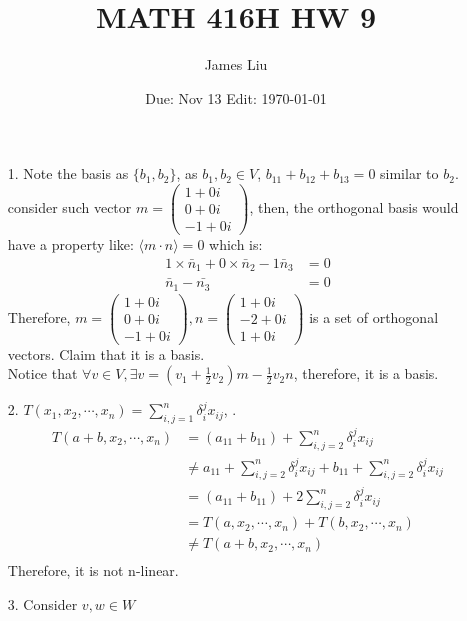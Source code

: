 \documentclass{article}
\date{Due: Nov 13 Edit: \today}
\title{MATH 416H HW 9}
\author{James Liu}
\begin{document}
\maketitle
\begin{itemize}
    \item [1.] Note the basis as \(\{b_1,b_2\}\), as \(b_1,b_2\in V\), \(b_{11}+b_{12}+b_{13}=0\) similar to \(b_2\). consider such vector \(m=\begin{pmatrix}
        1+0i\\
        0+0i\\
        -1+0i
    \end{pmatrix}\), then, the orthogonal basis would have a property like: \(\langle m\cdot n\rangle =0\) which is:
    \begin{align*}
        1\times \bar{n}_1+0\times \bar{n}_2-1\bar{n}_3&=0\\
        \bar{n}_1-\bar{n_3}&=0
    \end{align*}
    Therefore, \(m=\begin{pmatrix}
        1+0i\\
        0+0i\\
        -1+0i
    \end{pmatrix}, n=\begin{pmatrix}
        1+0i\\
        -2+0i\\
        1+0i
    \end{pmatrix}\) is a set of orthogonal vectors.
    Claim that it is a basis.\\
    Notice that \(\forall v\in V, \exists v = (v_1+\frac{1}{2}v_2)m-\frac{1}{2}v_2n\), therefore, it is a basis.
    \item [2.] \(T(x_1,x_2,\cdots,x_n) = \sum_{i,j=1}^{n}\delta _i^jx_{ij}\), \(\). 
    \begin{align*}
        T(a+b,x_2,\cdots,x_n)&=(a_{11}+b_{11})+\sum_{i,j=2}^{n}\delta _i^jx_{ij}\\
        &\neq a_{11}+\sum_{i,j=2}^{n}\delta _i^jx_{ij}+b_{11}+\sum_{i,j=2}^{n}\delta _i^jx_{ij}\\
        &=(a_{11}+b_{11})+2\sum_{i,j=2}^{n}\delta _i^jx_{ij}\\
        &=T(a,x_2,\cdots,x_n)+T(b,x_2,\cdots,x_n)\\
        &\neq T(a+b,x_2,\cdots,x_n)\\
    \end{align*}
    Therefore, it is not n-linear.\\
    \item [3.] Consider \(v,w\in W\)

\end{itemize}
\end{document}
